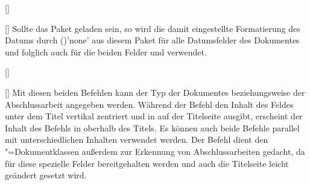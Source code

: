 \begin{Declaration*}{}
\begin{Declaration*}{}
\begin{Declaration*}{}
\begin{Declaration}{[]}
\begin{Declaration}{[]}
Sollte das Paket  geladen sein, so wird die damit eingestellte 
Formatierung des Datums durch ()'none' aus 
diesem Paket für alle Datumsfelder des Dokumentes und folglich auch für die 
beiden Felder  und  verwendet.
\end{Declaration}
\end{Declaration}

\begin{Declaration}{[]}
\begin{Declaration}{[]}
\printdeclarationlist%
%
%
%
Mit diesen beiden Befehlen kann der Typ der Dokumentes beziehungsweise der 
Abschlussarbeit angegeben werden. Während der Befehl  den Inhalt 
des Feldes unter dem Titel vertikal zentriert und in \DIN auf der Titelseite 
ausgibt, erscheint der Inhalt des Befehls  in \Univers oberhalb 
des Titels. Es können auch beide Befehle parallel mit unterschiedlichen 
Inhalten verwendet werden. Der Befehl  dient den 
\TUDScript"=Dokumentklassen außerdem zur Erkennung von Abschlussarbeiten 
gedacht, da für diese spezielle Felder bereitgehalten werden und auch die 
Titelseite leicht geändert gesetzt wird.


\end{Declaration}
\end{Declaration}
\end{Declaration*}
\end{Declaration*}
\end{Declaration*}
